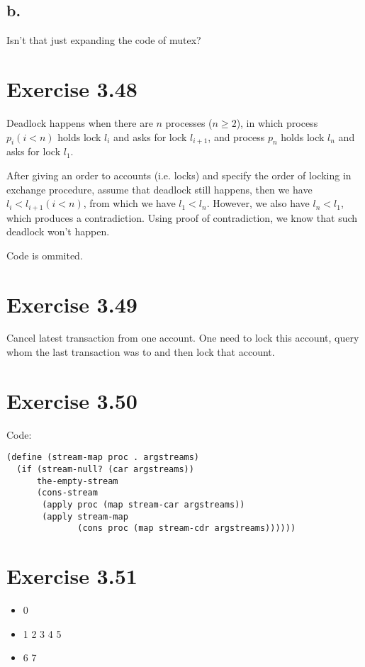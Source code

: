\documentclass[../main.tex]{subfiles}
\begin{document}
\subsection{b.}

Isn't that just expanding the code of mutex?

\section{Exercise 3.48}

Deadlock happens when there are $n$ processes ($n \ge 2$), in which process $p_i (i < n)$ holds lock $l_i$ and asks for lock $l_{i+1}$, and process $p_n$ holds lock $l_n$ and asks for lock $l_1$.

After giving an order to accounts (i.e. locks) and specify the order of locking in exchange procedure, assume that deadlock still happens, then we have $l_i < l_{i+1} (i < n)$, from which we have $l_1 < l_n$. However, we also have $l_n < l_1$, which produces a contradiction. Using proof of contradiction, we know that such deadlock won't happen.

Code is ommited.

\section{Exercise 3.49}

Cancel latest transaction from one account. One need to lock this account, query whom the last transaction was to and then lock that account.

\section{Exercise 3.50}

Code:

\begin{lstlisting}
(define (stream-map proc . argstreams)
  (if (stream-null? (car argstreams))
      the-empty-stream
      (cons-stream
       (apply proc (map stream-car argstreams))
       (apply stream-map
              (cons proc (map stream-cdr argstreams))))))
\end{lstlisting}

\section{Exercise 3.51}

\begin{itemize}
\item 0
\item 1 2 3 4 5
\item 6 7
\end{itemize}
\end{document}
